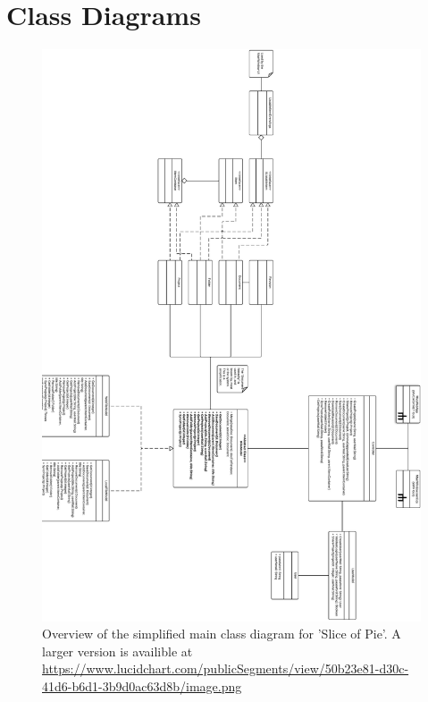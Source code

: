 \section{Class Diagrams}
\label{sec:class-diagrams-appendix}

\begin{figure}[H]
    \begin{center}
        \includegraphics[width=1\textwidth]{Software_design/graphics/mainClassDiagram.png}
        \caption{Overview of the simplified main class diagram for 'Slice of Pie'. A larger version is availible at \url{https://www.lucidchart.com/publicSegments/view/50b23e81-d30c-41d6-b6d1-3b9d0ac63d8b/image.png}}
        \label{fig:design-class_diagram} 
    \end{center}
\end{figure}


